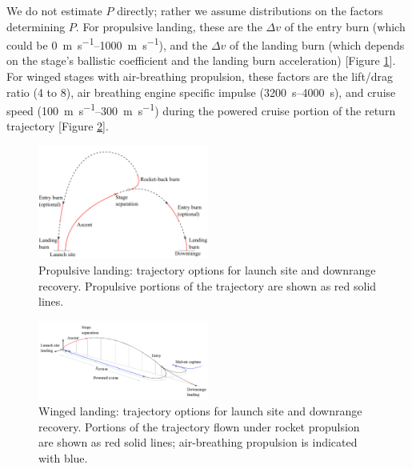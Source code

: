 \documentclass[conf]{new-aiaa}
\begin{document}
\begin{multicols}{2}
We do not estimate $P$ directly; rather we assume distributions on the factors determining $P$. For propulsive landing, these are the $\Delta v$ of the entry burn (which could be \SIrange{0}{1000}{\meter\per\second}), and the $\Delta v$ of the landing burn (which depends on the stage's ballistic coefficient and the landing burn acceleration) [Figure \ref{fig:propulsive_landing}]. For winged stages with air-breathing propulsion, these factors are the lift/drag ratio (4 to 8), air breathing engine specific impulse (\SIrange{3200}{4000}{\second}), and cruise speed (\SIrange{100}{300}{\meter\per\second}) during the powered cruise portion of the return trajectory [Figure \ref{fig:flyback_trajectory}].

\begin{figure}[H]
    \centering
    \includegraphics[width=0.5\textwidth]{propulsive_landing}
    \caption{\label{fig:propulsive_landing} Propulsive landing: trajectory options for launch site and downrange recovery. Propulsive portions of the trajectory are shown as red solid lines.}
\end{figure}

\begin{figure}[H]
    \centering
    \includegraphics[width=0.5\textwidth]{flyback_trajectory_cropped}
    \caption{\label{fig:flyback_trajectory} Winged landing: trajectory options for launch site and downrange recovery. Portions of the trajectory flown under rocket propulsion are shown as red solid lines; air-breathing propulsion is indicated with blue.}
\end{figure}


\end{multicols}
\end{document}
